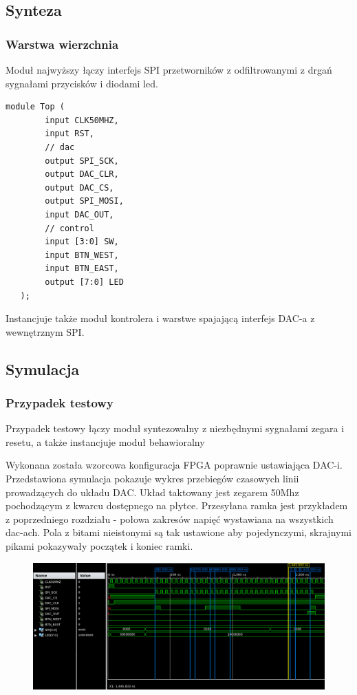 \documentclass[a4paper,12pt]{article}
\begin{document}
\subsection{Synteza}

\subsubsection{Warstwa wierzchnia}

Moduł najwyższy łączy interfejs SPI przetworników z odfiltrowanymi z drgań sygnałami przycisków i diodami led.
\begin{lstlisting}[label=Top,caption=Top.v]
module Top (
        input CLK50MHZ,
        input RST,
        // dac
        output SPI_SCK,
        output DAC_CLR,
        output DAC_CS,
        output SPI_MOSI,
        input DAC_OUT,
        // control
        input [3:0] SW,
        input BTN_WEST,
        input BTN_EAST,
        output [7:0] LED
   );
\end{lstlisting}
Instancjuje także moduł kontrolera i warstwe spajającą interfejs DAC-a z wewnętrznym SPI.

\subsection{Symulacja}


\subsubsection{Przypadek testowy}
Przypadek testowy łączy moduł syntezowalny z niezbędnymi sygnałami zegara i resetu, a także instancjuje moduł behawioralny




Wykonana została wzorcowa konfiguracja FPGA poprawnie ustawiająca DAC-i. Przedstawiona symulacja pokazuje wykres przebiegów czasowych linii prowadzących do układu DAC. Układ taktowany jest zegarem 50Mhz pochodzącym z kwarcu dostępnego na płytce. Przesyłana ramka jest przykładem z poprzedniego rozdziału - połowa zakresów napięć wystawiana na wszystkich dac-ach. Pola z bitami nieistonymi są tak ustawione aby pojedynczymi, skrajnymi pikami pokazywały początek i koniec ramki.

\begin{figure}[htb]
   \centering
   \includegraphics[width=13cm]{grafika/toptest-fastdac-110.png}
\end{figure}
\end{document}
